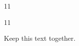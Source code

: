 \documentclass[paper=A4]{ropas-poster}
\begin{document}
\begin{postergrid}{1}{1}
\begin{posterblock}{1}{1}
\begin{samepage}Keep this text together.\end{samepage}
\end{posterblock}
\end{postergrid}
\end{document}
